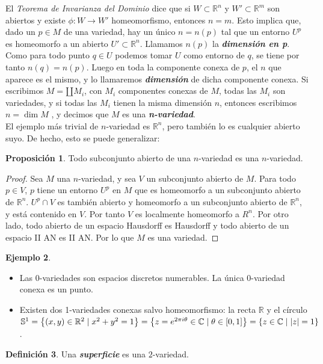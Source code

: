 \documentclass[10pt]{report}
\newcommand{\C}{\mathbb{C}}
\newcommand{\R}{\mathbb{R}}
\DeclareMathOperator{\dimension}{dim} %
\newcommand{\enfatiza}[1]{\textbf{\textit{#1}}}
\theoremstyle{definition}
\newtheorem{defin}{Definición}[section]
\newtheorem{prop}[defin]{Proposición}
\newtheorem{eje}[defin]{Ejemplo}
\begin{document}
El \textit{Teorema de Invarianza del Dominio} dice que si $W\subset \R^n$ y $W'\subset \R^m$ son abiertos y existe $\phi: W \rightarrow W'$ homeomorfismo, entonces $n=m$. Esto implica que, dado un  $p\in M$ de una variedad, hay un único $n=n(p)$ tal que un entorno $U^p$ es homeomorfo a un abierto $U'\subset \R^n$. Llamamos $n(p)$ la \enfatiza{dimensión en p}. Como para todo punto $q\in U$ podemos tomar $U$ como entorno de $q$, se tiene por tanto $n(q)=n(p)$. Luego en toda la componente conexa de $p$, el $n$ que aparece es el mismo, y lo llamaremos \enfatiza{dimensión} de dicha componente conexa. Si escribimos $M=\amalg M_i$, con $M_i$ componentes conexas de $M$, todas las $M_i$ son variedades, y si todas las $M_i$ tienen la misma dimensión $n$, entonces escribimos $n=\dimension{M}$ , y decimos que $M$ es una \enfatiza{n-variedad}.\\
El ejemplo más trivial de $n$-variedad es $\R^n$, pero también lo es cualquier abierto suyo. De hecho, esto se puede generalizar:
\begin{prop}%
Todo subconjunto abierto de una $n$-variedad es una $n$-variedad.
\end{prop}
\begin{proof}
Sea $M$ una $n$-variedad, y sea $V$ un subconjunto abierto de $M$. Para todo $p\in V$, $p$ tiene un entorno $U^p$ en $M$ que es homeomorfo a un subconjunto abierto de $\R^n$. $U^p\cap V$ es también abierto y homeomorfo a un subconjunto abierto de $\R^n$, y está contenido en $V$. Por tanto $V$ es localmente homeomorfo a $R^n$. Por otro lado, todo abierto de un espacio Hausdorff es Hausdorff y todo abierto de un espacio II AN es II AN. Por lo que $M$ es una variedad.
\end{proof}
\begin{eje}%
\begin{itemize}
\item Las 0-variedades son espacios discretos numerables. La única 0-variedad conexa es un punto.
\item Existen dos 1-variedades conexas salvo homeomorfismo: la recta $\R$ y el círculo $\mathbb{S}^1\\
=\left\{(x,y)\in \R^2\mid x^2+y^2=1\right\}=\left\{z=e^{2\pi i\theta}\in \C \mid \theta \in \left[0,1\right] \right\}=\left\{ z\in \C \mid |z|=1\right\}$.
\end{itemize}
\end{eje}
\begin{defin}%
Una \textbf{\emph{superficie}} es una $2$-variedad.
\end{defin}
\end{document}
